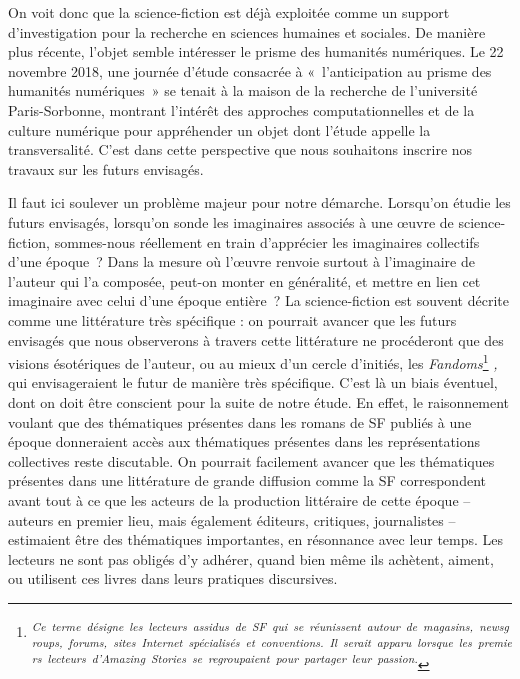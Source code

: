 \documentclass[letterpaper,portrait,12pt]{article}
\begin{document}
{\footnotesize 	}On voit donc que la science-fiction est d\'{e}j\`{a} exploit\'{e}e comme un support d'investigation pour la recherche en sciences humaines et sociales. De mani\`{e}re plus r\'{e}cente, l'objet semble int\'{e}resser le prisme des humanit\'{e}s num\'{e}riques. Le 22 novembre 2018, une journ\'{e}e d'\'{e}tude consacr\'{e}e \`{a} « l'anticipation au prisme des humanit\'{e}s num\'{e}riques » se tenait \`{a} la maison de la recherche de l'universit\'{e} Paris-Sorbonne, montrant l'int\'{e}r\^{e}t des approches computationnelles et de la culture num\'{e}rique pour appr\'{e}hender un objet dont l'\'{e}tude appelle la transversalit\'{e}. C'est dans cette perspective que nous souhaitons inscrire nos travaux sur les futurs envisag\'{e}s.





	Il faut ici soulever un probl\`{e}me majeur pour notre d\'{e}marche. Lorsqu'on \'{e}tudie les futurs envisag\'{e}s, lorsqu'on sonde les imaginaires associ\'{e}s \`{a} une \oe{}uvre de science-fiction, sommes-nous r\'{e}ellement en train d'appr\'{e}cier les imaginaires collectifs d'une \'{e}poque ? Dans la mesure où l'\oe{}uvre renvoie surtout \`{a} l'imaginaire de l'auteur qui l'a compos\'{e}e, peut-on monter en g\'{e}n\'{e}ralit\'{e}, et mettre en lien cet imaginaire avec celui d'une \'{e}poque enti\`{e}re ? La science-fiction est souvent d\'{e}crite comme une litt\'{e}rature tr\`{e}s sp\'{e}cifique : on pourrait avancer que les futurs envisag\'{e}s que nous observerons \`{a} travers cette litt\'{e}rature ne proc\'{e}deront que des visions \'{e}sot\'{e}riques de l'auteur, ou au mieux d'un cercle d'initi\'{e}s, les\emph{ Fandoms}\footnote{\emph{\textsuperscript{\newpage
}}\emph{\textsuperscript{	Ce\ terme\ d\'{e}signe\ les\ lecteurs\ assidus\ de\ SF\ qui\ se\ r\'{e}unissent\ autour\ de\ magasins,\ newsgroups,\ forums,\ sites\ Internet\ sp\'{e}cialis\'{e}s\ et\ conventions.\ Il\ serait\ apparu\ lorsque\ les\ premiers\ lecteurs\ d'Amazing\ Stories\ se\ regroupaient\ pour\ partager\ leur\ passion.}}} \emph{, }qui envisageraient le futur de mani\`{e}re tr\`{e}s sp\'{e}cifique. C'est l\`{a} un biais \'{e}ventuel, dont on doit \^{e}tre conscient pour la suite de notre \'{e}tude. En effet, le raisonnement voulant que des th\'{e}matiques pr\'{e}sentes dans les romans de SF publi\'{e}s \`{a} une \'{e}poque donneraient acc\`{e}s aux th\'{e}matiques pr\'{e}sentes dans les repr\'{e}sentations collectives reste discutable. On pourrait facilement avancer que les th\'{e}matiques pr\'{e}sentes dans une litt\'{e}rature de grande diffusion comme la SF correspondent avant tout \`{a} ce que les acteurs de la production litt\'{e}raire de cette \'{e}poque -- auteurs en premier lieu, mais \'{e}galement \'{e}diteurs, critiques, journalistes -- estimaient \^{e}tre des th\'{e}matiques importantes, en r\'{e}sonnance avec leur temps. Les lecteurs ne sont pas oblig\'{e}s d'y adh\'{e}rer, quand bien m\^{e}me ils ach\`{e}tent, aiment, ou utilisent ces livres dans leurs pratiques discursives.
\end{document}
